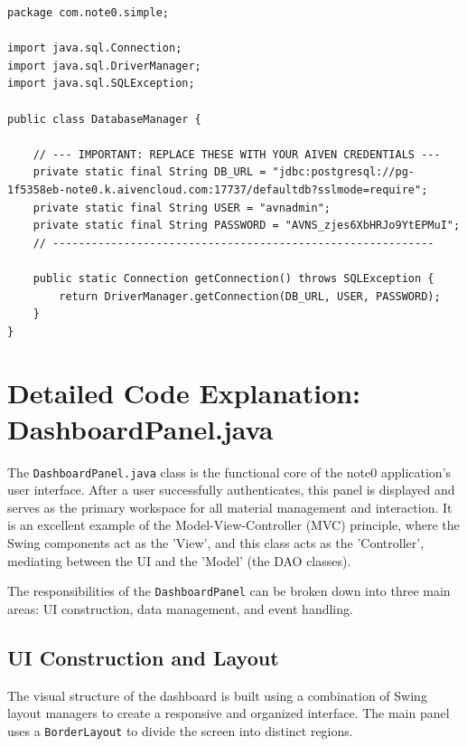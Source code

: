 \documentclass[12pt, a4paper]{report}
\begin{document}
\begin{verbatim}
package com.note0.simple;

import java.sql.Connection;
import java.sql.DriverManager;
import java.sql.SQLException;

public class DatabaseManager {

    // --- IMPORTANT: REPLACE THESE WITH YOUR AIVEN CREDENTIALS ---
    private static final String DB_URL = "jdbc:postgresql://pg-1f5358eb-note0.k.aivencloud.com:17737/defaultdb?sslmode=require";
    private static final String USER = "avnadmin";
    private static final String PASSWORD = "AVNS_zjes6XbHRJo9YtEPMuI";
    // -----------------------------------------------------------

    public static Connection getConnection() throws SQLException {
        return DriverManager.getConnection(DB_URL, USER, PASSWORD);
    }
}
\end{verbatim}

\chapter{Detailed Code Explanation: DashboardPanel.java}

The \texttt{DashboardPanel.java} class is the functional core of the note0 application's user interface. After a user successfully authenticates, this panel is displayed and serves as the primary workspace for all material management and interaction. It is an excellent example of the Model-View-Controller (MVC) principle, where the Swing components act as the 'View', and this class acts as the 'Controller', mediating between the UI and the 'Model' (the DAO classes).

The responsibilities of the \texttt{DashboardPanel} can be broken down into three main areas: UI construction, data management, and event handling.

\section{UI Construction and Layout}
The visual structure of the dashboard is built using a combination of Swing layout managers to create a responsive and organized interface. The main panel uses a \texttt{BorderLayout} to divide the screen into distinct regions.
\end{document}
